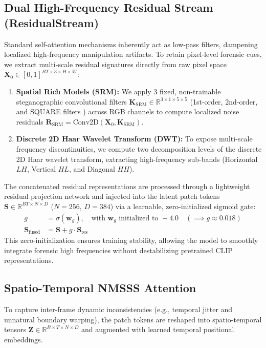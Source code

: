 \subsection{Dual High-Frequency Residual Stream (ResidualStream)}
Standard self-attention mechanisms inherently act as low-pass filters, dampening localized high-frequency manipulation artifacts. To retain pixel-level forensic cues, we extract multi-scale residual signatures directly from raw pixel space $\mathbf{X}_0 \in [0, 1]^{BT \times 3 \times H \times W}$:
\begin{enumerate}[leftmargin=*]
    \item \textbf{Spatial Rich Models (SRM):} We apply 3 fixed, non-trainable steganographic convolutional filters $\mathbf{K}_{\text{SRM}} \in \mathbb{R}^{3 \times 1 \times 5 \times 5}$ (1st-order, 2nd-order, and SQUARE filters \citep{fridrich2012rich}) across RGB channels to compute localized noise residuals $\mathbf{R}_{\text{SRM}} = \text{Conv2D}(\mathbf{X}_0, \mathbf{K}_{\text{SRM}})$.
    \item \textbf{Discrete 2D Haar Wavelet Transform (DWT):} To expose multi-scale frequency discontinuities, we compute two decomposition levels of the discrete 2D Haar wavelet transform, extracting high-frequency sub-bands (Horizontal $LH$, Vertical $HL$, and Diagonal $HH$).
\end{enumerate}
The concatenated residual representations are processed through a lightweight residual projection network and injected into the latent patch tokens $\mathbf{S} \in \mathbb{R}^{BT \times N \times D}$ ($N=256$, $D=384$) via a learnable, zero-initialized sigmoid gate:
\begin{align}
g &= \sigma(\mathbf{w}_g), \quad \text{with } \mathbf{w}_g \text{ initialized to } -4.0 \quad (\implies g \approx 0.018) \\
\mathbf{S}_{\text{fused}} &= \mathbf{S} + g \cdot \mathbf{S}_{\text{res}}
\end{align}
This zero-initialization ensures training stability, allowing the model to smoothly integrate forensic high frequencies without destabilizing pretrained CLIP representations.

\subsection{Spatio-Temporal NMSSS Attention}
To capture inter-frame dynamic inconsistencies (e.g., temporal jitter and unnatural boundary warping), the patch tokens are reshaped into spatio-temporal tensors $\mathbf{Z} \in \mathbb{R}^{B \times T \times N \times D}$ and augmented with learned temporal positional embeddings. 


